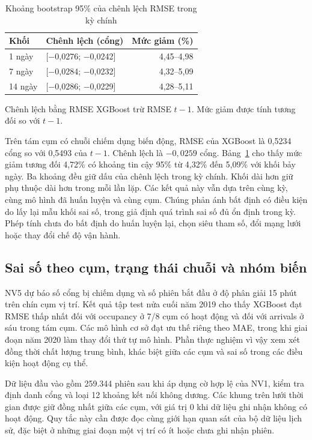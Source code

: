 \documentclass[conference,a4paper]{IEEEtran}
\begin{document}
\begin{table}[!t]
\caption{Khoảng bootstrap 95\% của chênh lệch RMSE trong kỳ chính}
\label{tab:bootstrap_summary}
\centering\footnotesize
\setlength{\tabcolsep}{4pt}
\begin{tabularx}{\columnwidth}{@{}lXr@{}}
\toprule
\textbf{Khối} & \textbf{Chênh lệch (cổng)} & \textbf{Mức giảm (\%)} \\
\midrule
1 ngày & [−0,0276; −0,0242] & 4,45--4,98 \\
7 ngày & [−0,0284; −0,0232] & 4,32--5,09 \\
14 ngày & [−0,0286; −0,0229] & 4,28--5,11 \\
\bottomrule
\end{tabularx}
\par\smallskip
\raggedright\scriptsize Chênh lệch bằng RMSE XGBoost trừ RMSE $t-1$. Mức giảm được tính tương đối so với $t-1$.
\end{table}


Trên tám cụm có chuỗi chiếm dụng biến động, RMSE của XGBoost là 0,5234 cổng so với 0,5493 của $t-1$. Chênh lệch là $-0{,}0259$ cổng. Bảng~\ref{tab:bootstrap_summary} cho thấy mức giảm tương đối 4,72\% có khoảng tin cậy 95\% từ 4,32\% đến 5,09\% với khối bảy ngày. Ba khoảng đều giữ dấu của chênh lệch trong kỳ chính. Khối dài hơn giữ phụ thuộc dài hơn trong mỗi lần lặp. Các kết quả này vẫn dựa trên cùng kỳ, cùng mô hình đã huấn luyện và cùng cụm. Chúng phản ánh bất định có điều kiện do lấy lại mẫu khối sai số, trong giả định quá trình sai số đủ ổn định trong kỳ. Phép tính chưa đo bất định do huấn luyện lại, chọn siêu tham số, đổi mạng lưới hoặc thay đổi chế độ vận hành.

\subsection{Sai số theo cụm, trạng thái chuỗi và nhóm biến}

NV5 dự báo số cổng bị chiếm dụng và số phiên bắt đầu ở độ phân giải 15 phút trên chín cụm vị trí. Kết quả tập test nửa cuối năm 2019 cho thấy XGBoost đạt RMSE thấp nhất đối với occupancy ở 7/8 cụm có hoạt động và đối với arrivals ở sáu trong tám cụm. Các mô hình cơ sở đạt ưu thế riêng theo MAE, trong khi giai đoạn năm 2020 làm thay đổi thứ tự mô hình. Phần thực nghiệm vì vậy xem xét đồng thời chất lượng trung bình, khác biệt giữa các cụm và sai số trong các điều kiện hoạt động cụ thể.

Dữ liệu đầu vào gồm 259.344 phiên sau khi áp dụng cờ hợp lệ của NV1, kiểm tra định danh cổng và loại 12 khoảng kết nối không dương. Các khung trên lưới thời gian được giữ đồng nhất giữa các cụm, với giá trị 0 khi dữ liệu ghi nhận không có hoạt động. Quy tắc này cần được đọc cùng giới hạn quan sát của bộ dữ liệu lịch sử, đặc biệt ở những giai đoạn một vị trí có ít hoặc chưa ghi nhận phiên.
\end{document}
